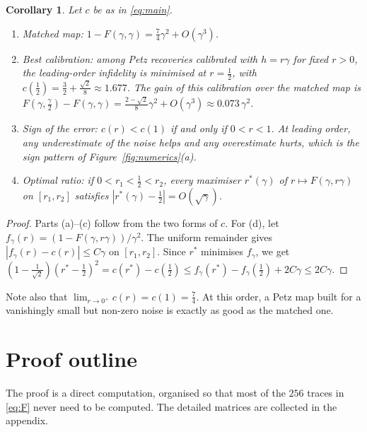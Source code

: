 \documentclass[11pt,a4paper]{article}
\theoremstyle{plain}
\newtheorem{corollary}[theorem]{Corollary}
\begin{document}
\begin{corollary}\label{cor:calibration}
Let $c$ be as in \eqref{eq:main}.
\begin{enumerate}
  \item[(a)] \emph{Matched map:} $1-F(\gamma,\gamma)=\frac74\gamma^2+O(\gamma^3)$.
  \item[(b)] \emph{Best calibration:} among Petz recoveries calibrated with $h=r\gamma$ for fixed $r>0$, the leading-order infidelity is minimised at $r=\frac12$, with $c(\frac12)=\frac32+\frac{\sqrt2}8\approx1.677$. The gain of this calibration over the matched map is $F(\gamma,\frac\gamma2)-F(\gamma,\gamma)=\frac{2-\sqrt2}8\gamma^2+O(\gamma^3)\approx0.073\,\gamma^2$.
  \item[(c)] \emph{Sign of the error:} $c(r)<c(1)$ if and only if $0<r<1$. At leading order, any underestimate of the noise helps and any overestimate hurts, which is the sign pattern of Figure~\ref{fig:numerics}(a).
  \item[(d)] \emph{Optimal ratio:} if $0<r_1<\frac12<r_2$, every maximiser $r^*(\gamma)$ of $r\mapsto F(\gamma,r\gamma)$ on $[r_1,r_2]$ satisfies $|r^*(\gamma)-\frac12|=O(\sqrt\gamma)$.
\end{enumerate}
\end{corollary}

\begin{proof}
Parts (a)--(c) follow from the two forms of $c$. For (d), let $f_\gamma(r)=(1-F(\gamma,r\gamma))/\gamma^2$. The uniform remainder gives $|f_\gamma(r)-c(r)|\le C\gamma$ on $[r_1,r_2]$. Since $r^*$ minimises $f_\gamma$, we get $(1-\frac1{\sqrt2})(r^*-\frac12)^2=c(r^*)-c(\frac12)\le f_\gamma(r^*)-f_\gamma(\frac12)+2C\gamma\le2C\gamma$.
\end{proof}

Note also that $\lim_{r\to0^+}c(r)=c(1)=\frac74$. At this order, a Petz map built for a vanishingly small but non-zero noise is exactly as good as the matched one.

\section{Proof outline}\label{sec:proof}

The proof is a direct computation, organised so that most of the $256$ traces in \eqref{eq:F} never need to be computed. The detailed matrices are collected in the appendix. 
\end{document}
